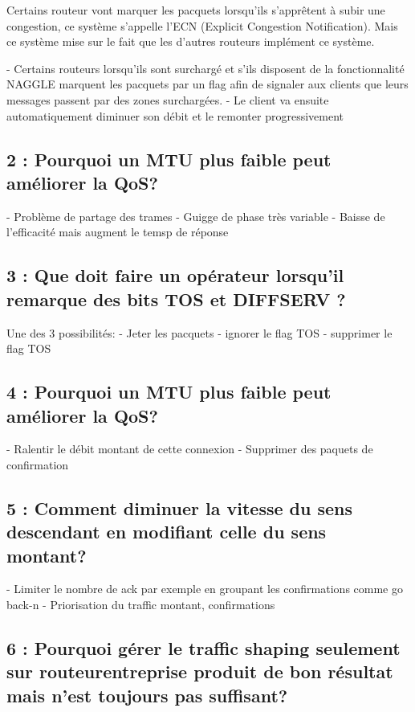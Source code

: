 \documentclass{article}
\begin{document}
Certains routeur vont marquer les pacquets lorsqu'ils s'apprêtent à subir une congestion, ce système s'appelle l'ECN (Explicit Congestion Notification). Mais ce système mise sur le fait que les d'autres routeurs implément ce système. \cite{cours}

- Certains routeurs lorsqu'ils sont surchargé et s'ils disposent de la fonctionnalité NAGGLE marquent les pacquets par un flag afin de signaler aux clients que leurs messages passent par des zones surchargées.
- Le client va ensuite automatiquement diminuer son débit et le remonter progressivement

\subsection*{2 : Pourquoi un MTU plus faible peut améliorer la QoS?}

- Problème de partage des trames
- Guigge de phase très variable
- Baisse de l'efficacité mais augment le temsp de réponse

\subsection*{3 : Que doit faire un opérateur lorsqu'il remarque des bits TOS et DIFFSERV ?}

Une des 3 possibilités:
- Jeter les pacquets
- ignorer le flag TOS
- supprimer le flag TOS

\subsection*{4 : Pourquoi un MTU plus faible peut améliorer la QoS?}

- Ralentir le débit montant de cette connexion
- Supprimer des paquets de confirmation


\subsection*{5 : Comment diminuer la vitesse du sens descendant en modifiant celle du sens montant?}

- Limiter le nombre de ack par exemple en groupant les confirmations comme go back-n
- Priorisation du traffic montant, confirmations


\subsection*{6 : Pourquoi gérer le traffic shaping seulement sur routeurentreprise produit de bon résultat mais n'est toujours pas suffisant?}
\end{document}
